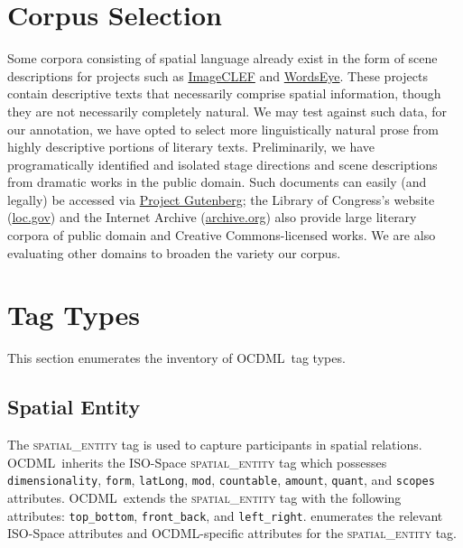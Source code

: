 \documentclass[11pt]{article}
\newcommand{\ML}{OCDML}
\begin{document}
\section{Corpus Selection} %
\label{sec:corpus_selection}
Some corpora consisting of spatial language already exist in the form of scene descriptions for projects such as \href{http://imageclef.org/photodata}{ImageCLEF} and \href{http://lucky.cs.columbia.edu:2001/}{WordsEye}. These projects contain descriptive texts that necessarily comprise spatial information, though they are not necessarily completely natural. We may test against such data, for our annotation, we have opted to select more linguistically natural prose from highly descriptive portions of literary texts. Preliminarily, we have programatically identified and isolated stage directions and scene descriptions from dramatic works in the public domain. Such documents can easily (and legally) be accessed via \href{http://www.gutenberg.org}{Project Gutenberg}; the Library of Congress's website (\href{loc.gov}{loc.gov}) and the Internet Archive (\href{archive.org}{archive.org}) also provide large literary corpora of public domain and Creative Commons-licensed works. We are also evaluating other domains to broaden the variety our corpus.

\section{Tag Types} %
\label{sec:tag_types}

This section enumerates the inventory of \ML~tag types.

\subsection{Spatial Entity} %
\label{sub:spatial_entity}

The \textsc{spatial\_entity} tag is used to capture participants in spatial relations. \ML~inherits the ISO-Space \textsc{spatial\_entity} tag which possesses \texttt{dimensionality}, \texttt{form}, \texttt{latLong}, \texttt{mod}, \texttt{countable}, \texttt{amount}, \texttt{quant}, and \texttt{scopes} attributes. \ML~extends the \textsc{spatial\_entity} tag with the following attributes: \texttt{top\_bottom}, \texttt{front\_back}, and \texttt{left\_right}.  enumerates the relevant ISO-Space attributes and \ML-specific attributes for the \textsc{spatial\_entity} tag.
\end{document}

